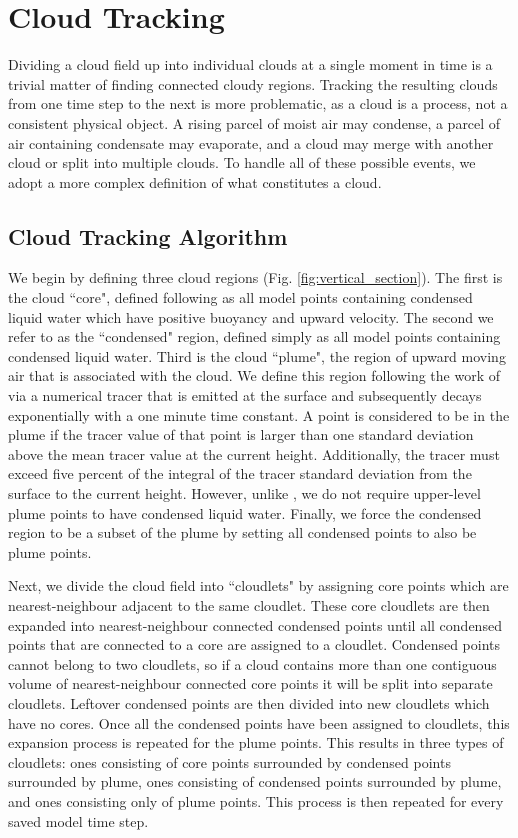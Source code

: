 \documentclass[acp]{copernicus}
\begin{document}
\section{Cloud Tracking}

Dividing a cloud field up into individual clouds at a single moment in time is 
a trivial matter of finding connected cloudy regions.  Tracking the resulting 
clouds from one time step to the next is more problematic, as a cloud is a 
process, not a consistent physical object.  A rising parcel of moist air may 
condense, a parcel of air containing condensate may evaporate, and a cloud 
may merge with another cloud or split into multiple clouds.  To handle all of 
these possible events, we adopt a more complex definition of what constitutes 
a cloud.

\subsection{Cloud Tracking Algorithm}

We begin by defining three cloud regions (Fig. \ref{fig:vertical_section}).  
The first is the cloud ``core", defined following \cite{Siebesma1995} as all 
model points containing condensed liquid water which have positive buoyancy and 
upward velocity.  The second we refer to as the ``condensed" region, defined 
simply as all model points containing condensed liquid water.  Third is the 
cloud ``plume", the region of upward moving air that is associated with the 
cloud.  We define this region following the work of \cite{Couvreaux2010} via a 
numerical tracer that is emitted at the surface and subsequently decays 
exponentially with a one minute time constant.  A point is considered to be in 
the plume if the tracer value of that point is larger than one standard 
deviation above the mean tracer value at the current height.  Additionally, 
the tracer must exceed five percent of the integral of the tracer standard 
deviation from the surface to the current height.  However, unlike 
\citeauthor{Couvreaux2010}, we do not require upper-level plume points to have 
condensed liquid water.  Finally, we force the condensed region to be a subset 
of the plume by setting all condensed points to also be plume points.

Next, we divide the cloud field into ``cloudlets" by assigning core points 
which are nearest-neighbour adjacent to the same cloudlet.  These core 
cloudlets are then expanded into nearest-neighbour connected condensed points 
until all condensed points that are connected to a core are assigned to a 
cloudlet.  Condensed points cannot belong to two cloudlets, so if a cloud 
contains more than one contiguous volume of nearest-neighbour connected core 
points it will be split into separate cloudlets.  Leftover condensed points are 
then divided into new cloudlets which have no cores.  Once all the condensed 
points have been assigned to cloudlets, this expansion process is repeated for 
the plume points.  This results in three types of cloudlets: ones consisting of 
core points surrounded by condensed points surrounded by plume, ones consisting 
of condensed points surrounded by plume, and ones consisting only of plume 
points.  This process is then repeated for every saved model time step.
\end{document}

